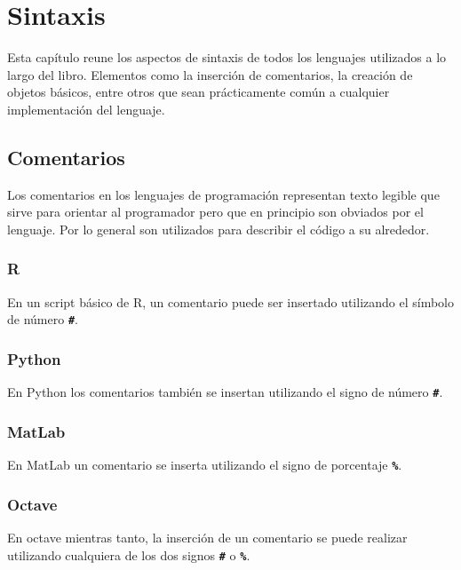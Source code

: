 \documentclass[
]{book}
\begin{document}
\hypertarget{sintaxis}{%
\chapter{Sintaxis}\label{sintaxis}}

Esta capítulo reune los aspectos de sintaxis de todos los lenguajes utilizados a lo largo del libro. Elementos como la inserción de comentarios, la creación de objetos básicos, entre otros que sean prácticamente común a cualquier implementación del lenguaje.

\hypertarget{comentarios}{%
\section{Comentarios}\label{comentarios}}

Los comentarios en los lenguajes de programación representan texto legible que sirve para orientar al programador pero que en principio son obviados por el lenguaje. Por lo general son utilizados para describir el código a su alrededor.

\hypertarget{r}{%
\subsection{R}\label{r}}

En un script básico de R, un comentario puede ser insertado utilizando el símbolo de número \textbf{\texttt{\#}}.

\hypertarget{python}{%
\subsection{Python}\label{python}}

En Python los comentarios también se insertan utilizando el signo de número \textbf{\texttt{\#}}.

\hypertarget{matlab}{%
\subsection{MatLab}\label{matlab}}

En MatLab un comentario se inserta utilizando el signo de porcentaje \textbf{\texttt{\%}}.

\hypertarget{octave}{%
\subsection{Octave}\label{octave}}

En octave mientras tanto, la inserción de un comentario se puede realizar utilizando cualquiera de los dos signos \textbf{\texttt{\#}} o \textbf{\texttt{\%}}.

  
\end{document}
